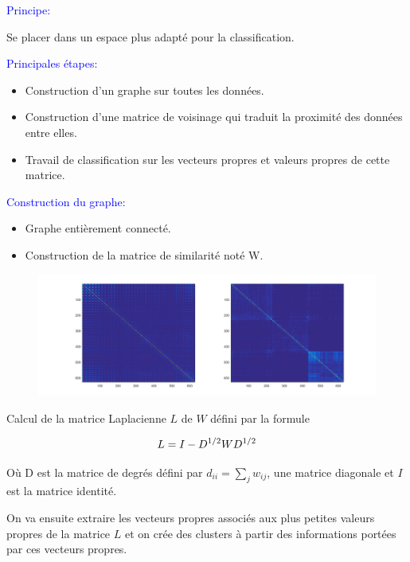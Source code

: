 \documentclass{beamer}
\begin{document}
\begin{frame}

\textcolor{blue}{Principe:}

\medskip
Se placer dans un espace plus adapté pour la classification.

\medskip

\textcolor{blue}{Principales étapes:}

\begin{itemize}
\item Construction d'un graphe sur toutes les données.
\item Construction d'une matrice de voisinage qui traduit la proximité des données entre elles.
\item Travail de classification sur les vecteurs propres et valeurs propres de cette matrice.
\end{itemize}

\end{frame}

\begin{frame}

\textcolor{blue}{Construction du graphe:}

\begin{itemize}
\item Graphe entièrement connecté.
\item Construction de la matrice de similarité noté W.
\end{itemize}

\begin{figure}
\centering
\includegraphics[scale=0.27,angle=0]{L.png}
\label{fig:MA} 
\end{figure}

\end{frame}

\begin{frame}

Calcul de la matrice Laplacienne $L$ de $W$ défini par la formule 


\begin{equation}
\centering
L = I - D^{1/2} W D^{1/2}
\end{equation}

Où D est la matrice de degrés défini par $d_{ii} = \sum_j w_{ij}$, une matrice diagonale et $I$ est la matrice identité.

\medskip

On va ensuite extraire les vecteurs propres associés aux plus petites valeurs propres de la matrice $L$ et on crée des clusters à partir des informations portées par ces vecteurs propres.

\end{frame}
\end{document}
